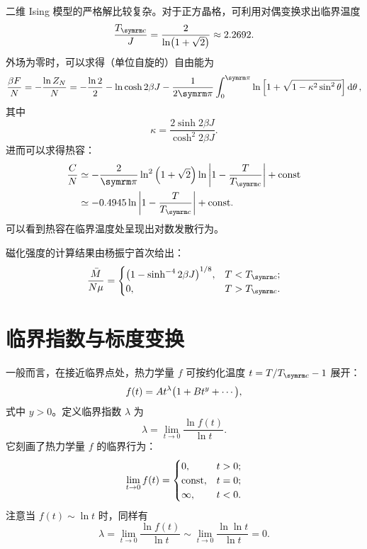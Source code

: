 二维 Ising 模型的严格解比较复杂。对于正方晶格，可利用对偶变换求出临界温度
\begin{equation}
  \frac{\Tc}{J} = \frac{2}{\ln(1+\sqrt{2})} \approx \num{2.2692}.
\end{equation}
外场为零时，可以求得（单位自旋的）自由能为
\begin{equation}
  \frac{\beta F}{N}
  = - \frac{\ln Z_N}{N}
  = - \frac{\ln 2}{2} - \ln\cosh 2\beta J
    - \frac{1}{2\pp} \int_0^\pp \ln\qty[1+\sqrt{1-\kappa^2\sin^2\theta}] \dd{\theta},
\end{equation}
其中
\begin{equation}
  \kappa = \frac{2\sinh 2\beta J}{\cosh^2 2\beta J}.
\end{equation}
进而可以求得热容：
\begin{align}
  \label{eq:ising-specific-heat}
  \frac{C}{N}
  & \simeq -\frac{2}{\pp} \ln^2 \qty(1+\sqrt{2}) \ln\abs{1-\frac{T}{\Tc}} + \const \notag \\
  & \simeq \num{-0.4945} \ln\abs{1-\frac{T}{\Tc}} + \const.
\end{align}
可以看到热容在临界温度处呈现出对数发散行为。

磁化强度的计算结果由杨振宁首次给出：
\begin{equation}
  \label{eq:ising-magnetization}
  \frac{\bar{M}}{N\mu} =
  \begin{cases}
    \qty(1 - \sinh^{-4} 2\beta J)^{1/8}, & T<\Tc; \\
    0, & T>\Tc.
  \end{cases}
\end{equation}

\section{临界指数与标度变换}

一般而言，在接近临界点处，热力学量 $f$ 可按约化温度 $t=T/\Tc-1$ 展开：
\begin{equation}
  f(t) = A t^\lambda \qty\big(1 + B t^y + \cdots),
\end{equation}
式中 $y>0$。定义临界指数 $\lambda$ 为
\begin{equation}
  \lambda = \lim_{t \to 0} \frac{\ln f(t)}{\ln t}.
\end{equation}
它刻画了热力学量 $f$ 的临界行为：
\begin{equation}
  \lim_{t \to 0} f(t) =
  \begin{cases}
    0,      & t > 0; \\
    \text{const}, & t = 0; \\
    \infty, & t < 0.
  \end{cases}
\end{equation}
注意当 $f(t) \sim \ln t$ 时，同样有
\begin{equation}
  \lambda =    \lim_{t \to 0} \frac{\ln f(t)}{\ln t}
          \sim \lim_{t \to 0} \frac{\ln \ln t}{\ln t} = 0.
\end{equation}

